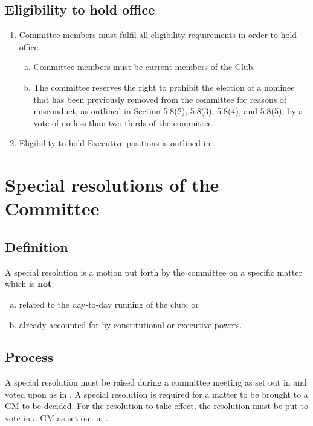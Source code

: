 \documentclass{constitution}
\begin{document}
\subsection{Eligibility to hold office}
\begin{enumerate}[(1)]
    \item Committee members must fulfil all eligibility requirements in order to hold office.
          \begin{enumerate}[(a)]
              \item Committee members must be current members of the Club.
              \item The committee reserves the right to prohibit the election of a nominee that has been previously removed from the committee for reasons of misconduct, as outlined in Section 5.8(2), 5.8(3), 5.8(4), and 5.8(5), by a vote of no less than two-thirds of the committee.
          \end{enumerate}
    \item Eligibility to hold Executive positions is outlined in .
\end{enumerate}


\section{Special resolutions of the Committee}\label{specialResolutionsCommittee}

\subsection{Definition}
A special resolution is a motion put forth by the committee on a specific matter which is \textbf{not}:
\begin{enumerate}[(a)]
    \item related to the day-to-day running of the club; or
    \item already accounted for by constitutional or executive powers.
\end{enumerate}

\subsection{Process}
A special resolution must be raised during a committee meeting as set out in  and voted upon as in . A special resolution is required for a matter to be brought to a GM to be decided.
For the resolution to take effect, the resolution must be put to vote in a GM as set out in .
\end{document}

